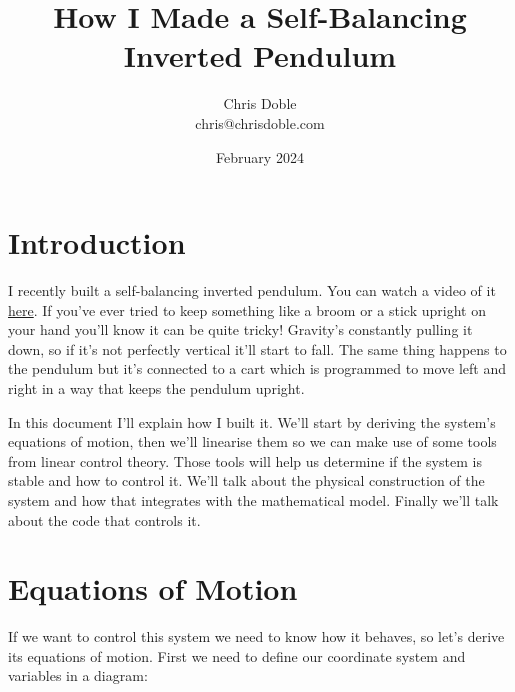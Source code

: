\documentclass{article}
\title{How I Made a Self-Balancing Inverted Pendulum}
\author{Chris Doble \\ chris@chrisdoble.com}
\date{February 2024}
\begin{document}
\maketitle

\tableofcontents

\section{Introduction}

I recently built a self-balancing inverted pendulum. You can watch a video of it \href{https://www.youtube.com/watch?v=-cd6RuVWI30}{here}. If you've ever tried to keep something like a broom or a stick upright on your hand you'll know it can be quite tricky! Gravity's constantly pulling it down, so if it’s not perfectly vertical it’ll start to fall. The same thing happens to the pendulum but it's connected to a cart which is programmed to move left and right in a way that keeps the pendulum upright.

In this document I’ll explain how I built it. We'll start by deriving the system's equations of motion, then we'll linearise them so we can make use of some tools from linear control theory. Those tools will help us determine if the system is stable and how to control it. We'll talk about the physical construction of the system and how that integrates with the mathematical model. Finally we'll talk about the code that controls it.

\section{Equations of Motion}

If we want to control this system we need to know how it behaves, so let’s derive its equations of motion. First we need to define our coordinate system and variables in a diagram:

\begin{figure}[H]
  \centering
\end{figure}
\end{document}
